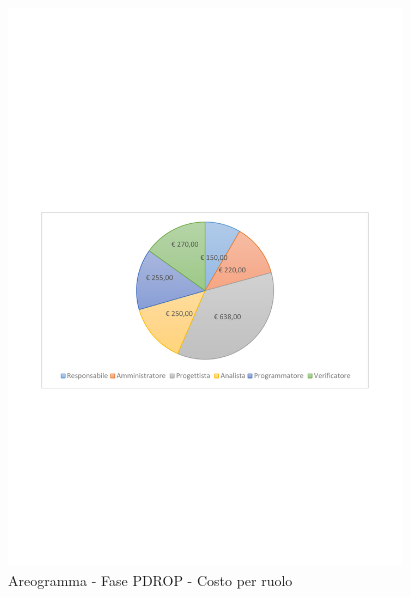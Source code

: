 \documentclass[../PianoProgetto.tex]{subfiles}
\begin{document}
	\begin{figure}[!h]
		\centering
		\includegraphics[width=0.93\textwidth , trim=2cm 9.5cm 2cm 11cm]{grafici/PDROP/PDROP-costo}
			\caption{Areogramma - Fase PDROP - Costo per ruolo}
		\label{fig:CircleChart-fasePDROP_costo}
	\end{figure}
\vfill
\end{document}
